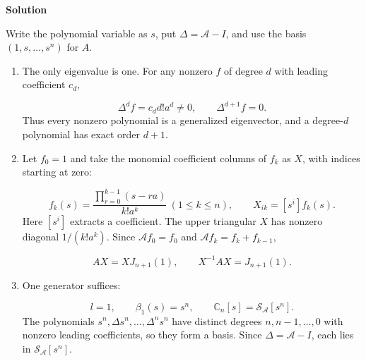 \documentclass[UTF8,10pt,letterpaper,fontset=fandol]{ctexart}
\newcommand{\C}{\mathbb C}
\begin{document}
\par{}\textbf{Solution}\par
Write the polynomial variable as $s$, put $\Delta=\mathcal A-I$, and use the basis $(1,s,\ldots,s^n)$ for $A$.

\begin{enumerate}
\item The only eigenvalue is one. For any nonzero $f$ of degree $d$ with leading coefficient $c_d$,

\[
\Delta^d f=c_d d!a^d\ne0,\qquad\Delta^{d+1}f=0.
\]
Thus every nonzero polynomial is a generalized eigenvector, and a degree-$d$ polynomial has exact order $d+1$.

\item Let $f_0=1$ and take the monomial coefficient columns of $f_k$ as $X$, with indices starting at zero:

\[
f_k(s)=\frac{\prod_{r=0}^{k-1}(s-ra)}{k!a^k}\ (1\le k\le n),\qquad\boxed{X_{ik}=[s^i]f_k(s)}.
\]
Here $[s^i]$ extracts a coefficient. The upper triangular $X$ has nonzero diagonal $1/(k!a^k)$. Since $\mathcal A f_0=f_0$ and $\mathcal A f_k=f_k+f_{k-1}$,

\[
\boxed{AX=XJ_{n+1}(1),\qquad X^{-1}AX=J_{n+1}(1)}.
\]

\item One generator suffices:

\[
\boxed{l=1,\qquad\beta_1(s)=s^n,\qquad\C_n[s]=\mathcal S_{\mathcal A}[s^n]}.
\]
The polynomials $s^n,\Delta s^n,\ldots,\Delta^ns^n$ have distinct degrees $n,n-1,\ldots,0$ with nonzero leading coefficients, so they form a basis. Since $\Delta=\mathcal A-I$, each lies in $\mathcal S_{\mathcal A}[s^n]$.

\end{enumerate}
\end{document}
